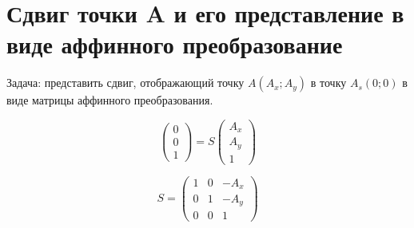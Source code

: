 \section{Сдвиг точки A и его представление в виде аффинного преобразование}

Задача: представить сдвиг, отображающий точку $A(A_x;A_y)$ в точку $A_s(0;0)$ в виде матрицы аффинного преобразования.

$$
\begin{pmatrix}
	0 \\
	0 \\
	1
\end{pmatrix}
= 
S
\begin{pmatrix}
	A_x \\
	A_y \\
	1
\end{pmatrix}
$$


$$S = \begin{pmatrix}
	1 & 0 & -A_x \\
	0 & 1 & -A_y \\
	0 & 0 & 1
\end{pmatrix}$$
